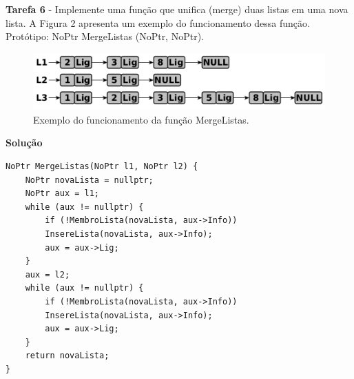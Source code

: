 \documentclass{article}
\begin{document}
\bigskip

\par
\noindent
\textbf{Tarefa 6}   - Implemente uma função que unifica (merge) duas listas em uma nova lista. A Figura 2 apresenta um exemplo do funcionamento dessa função.
Protótipo: NoPtr MergeListas (NoPtr, NoPtr).

\begin{figure}[h!]
	\clearpage
	\centering
	\includegraphics[width=0.8\linewidth]{lista/2.PNG}
	\caption{Exemplo do funcionamento da função MergeListas.}
\end{figure}

\bigskip
\par
\noindent
\textbf{Solução}
\begin{lstlisting}
NoPtr MergeListas(NoPtr l1, NoPtr l2) {
    NoPtr novaLista = nullptr;
    NoPtr aux = l1;
    while (aux != nullptr) {
        if (!MembroLista(novaLista, aux->Info))
        InsereLista(novaLista, aux->Info);
        aux = aux->Lig;
    }
    aux = l2;
    while (aux != nullptr) {
        if (!MembroLista(novaLista, aux->Info))
        InsereLista(novaLista, aux->Info);
        aux = aux->Lig;
    }
    return novaLista;
}
\end{lstlisting}

\bigskip    
\end{document}
